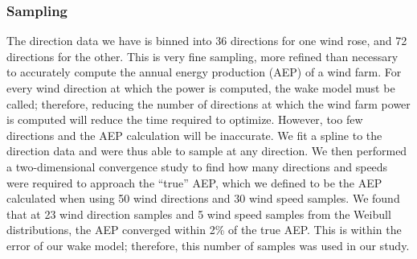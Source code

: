\subsubsection{Sampling}
The direction data we have is binned into 36 directions for one wind rose, and 72 directions for the other. This is very fine sampling, 
more refined than necessary to accurately compute the annual energy production (AEP) of a wind farm. 
For every wind direction at which the power is computed, the wake model must be called; therefore, reducing the number of directions at which the wind farm power is computed will reduce the time required to optimize. 
However, too few directions and the AEP calculation will be inaccurate. We fit a spline to the direction data and were thus able to sample at any direction. We then performed a two-dimensional convergence study to find how many directions and speeds were required to approach the ``true'' AEP, which we defined to be the AEP calculated when using 50 wind directions and 30 wind speed samples. 
We found that at 23 wind direction samples and 5 wind speed samples from the Weibull distributions, the AEP converged within 2\% of the true AEP. This is within the error of our wake model; therefore, this number of samples was used in our study. 
